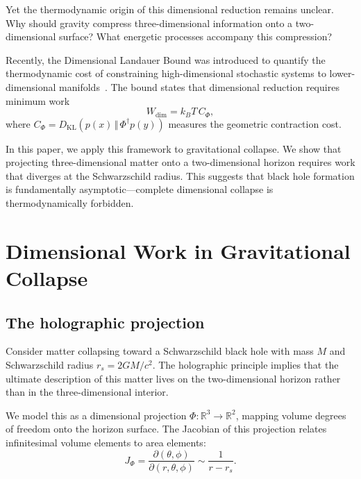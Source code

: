 \documentclass[aps,prd,twocolumn,superscriptaddress,floatfix]{revtex4-2}
\begin{document}
Yet the thermodynamic origin of this dimensional reduction remains unclear. Why should gravity compress three-dimensional information onto a two-dimensional surface? What energetic processes accompany this compression?

Recently, the Dimensional Landauer Bound was introduced to quantify the thermodynamic cost of constraining high-dimensional stochastic systems to lower-dimensional manifolds~\cite{todd2025landauer}. The bound states that dimensional reduction requires minimum work
\begin{equation}
W_{\mathrm{dim}} = k_B T \, C_\Phi,
\end{equation}
where $C_\Phi = D_{\mathrm{KL}}(p(x)\,\Vert\,\Phi^\dagger p(y))$ measures the geometric contraction cost.

In this paper, we apply this framework to gravitational collapse. We show that projecting three-dimensional matter onto a two-dimensional horizon requires work that diverges at the Schwarzschild radius. This suggests that black hole formation is fundamentally asymptotic---complete dimensional collapse is thermodynamically forbidden.

\section{Dimensional Work in Gravitational Collapse}

\subsection{The holographic projection}

Consider matter collapsing toward a Schwarzschild black hole with mass $M$ and Schwarzschild radius $r_s = 2GM/c^2$. The holographic principle implies that the ultimate description of this matter lives on the two-dimensional horizon rather than in the three-dimensional interior.

We model this as a dimensional projection $\Phi: \mathbb{R}^3 \to \mathbb{R}^2$, mapping volume degrees of freedom onto the horizon surface. The Jacobian of this projection relates infinitesimal volume elements to area elements:
\begin{equation}
J_\Phi = \frac{\partial(\theta, \phi)}{\partial(r, \theta, \phi)} \sim \frac{1}{r - r_s}.
\end{equation}
\end{document}
